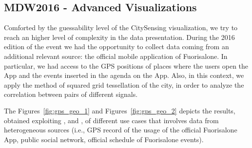 \subsection{MDW2016 - Advanced Visualizations} \label{sec:cs-mdw-2016}
Comforted by the guessability level of the CitySensing visualization, we try to reach an higher level of complexity in the data presentation.
During the 2016 edition of the event we had the opportunity to collect data coming from an additional relevant source: the official mobile application of Fuorisalone. In particular, we had access to the GPS positions of \textsf{place}s where the users open the App and the \textsf{event}s inserted in the agenda on the App. Also, in this context, we apply the method of squared \textsf{grid} tessellation of the city, in order to analyze the correlation between pairs of different signals.

The Figures~\ref{fig:gps_geo_1} and Figures~\ref{fig:gps_geo_2} depicts the results, obtained exploiting \frappe{}, \sti{} and \sparkdi{}, of different use cases that involves data from heterogeneous sources (i.e., GPS record of the usage of the official Fuorisalone App, public social network, official schedule of Fuorisalone events).

